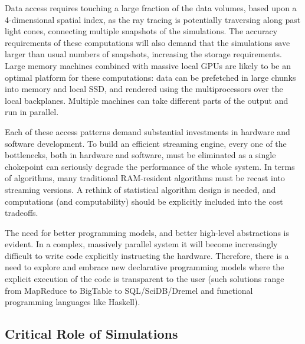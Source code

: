 Data access requires touching a large fraction of the data volumes,
based upon a 4-dimensional spatial index, as the ray tracing is
potentially traversing along past light cones, connecting multiple
snapshots of the simulations. The accuracy requirements of these
computations will also demand that the simulations save larger than
usual numbers of snapshots, increasing the storage requirements. Large
memory machines combined with massive local GPUs are likely to be an
optimal platform for these computations: data can be prefetched in
large chunks into memory and local SSD, and rendered using the
multiprocessors over the local backplanes. Multiple machines can take
different parts of the output and run in parallel.

Each of these access patterns demand substantial investments in
hardware and software development. To build an efficient streaming
engine, every one of the bottlenecks, both in hardware and software,
must be eliminated as a single chokepoint can seriously degrade the
performance of the whole system. In terms of algorithms, many
traditional RAM-resident algorithms must be recast into streaming
versions. A rethink of statistical algorithm design is needed, and
computations (and computability) should be explicitly included into
the cost tradeoffs.

The need for better programming models, and better high-level
abstractions is evident. In a complex, massively parallel system it
will become increasingly difficult to write code explicitly
instructing the hardware. Therefore, there is a need to explore and
embrace new declarative programming models where the explicit
execution of the code is transparent to the user (such solutions range
from MapReduce to BigTable to SQL/SciDB/Dremel and functional
programming languages like Haskell).


\subsection{Critical Role of Simulations}

